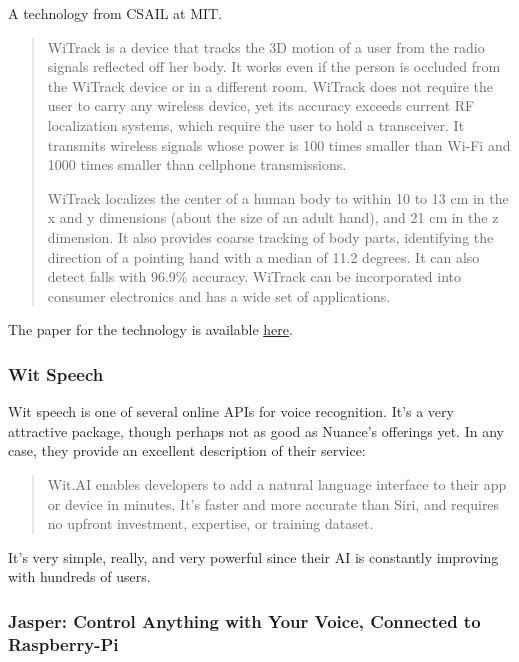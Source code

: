 			A technology from CSAIL at MIT.
			
			\begin{quote}
				WiTrack is a device that tracks the 3D motion of a user from the radio signals reflected off her body. It works even if the person is occluded from the WiTrack device or in a different room. WiTrack does not require the user to carry any wireless device, yet its accuracy exceeds current RF localization systems, which require the user to hold a transceiver. It transmits wireless signals whose power is 100 times smaller than Wi-Fi and 1000 times smaller than cellphone transmissions.
				
				WiTrack localizes the center of a human body to within 10 to 13 cm in the x and y dimensions (about the size of an adult hand), and 21 cm in the z dimension. It also provides coarse tracking of body parts, identifying the direction of a pointing hand with a median of 11.2 degrees. It can also detect falls with 96.9\% accuracy. WiTrack can be incorporated into consumer electronics and has a wide set of applications.
			\end{quote}
			
			The paper for the technology is available \href{http://witrack.csail.mit.edu/witrack-paper.pdf}{here}.
			
		\subsubsection{Wit Speech}
			
			Wit speech is one of several online APIs for voice recognition.
			It's a very attractive package, though perhaps not as good as Nuance's offerings yet.
			In any case, they provide an excellent description of their service:
			
			\begin{quote}
				Wit.AI enables developers to add a natural language interface to their app or device in minutes. It's faster and more accurate than Siri, and requires no upfront investment, expertise, or training dataset.
			\end{quote}
			
			It's very simple, really, and very powerful since their AI is constantly improving with hundreds of users.
		
		\subsubsection{Jasper: Control Anything with Your Voice, Connected to Raspberry-Pi}
		
